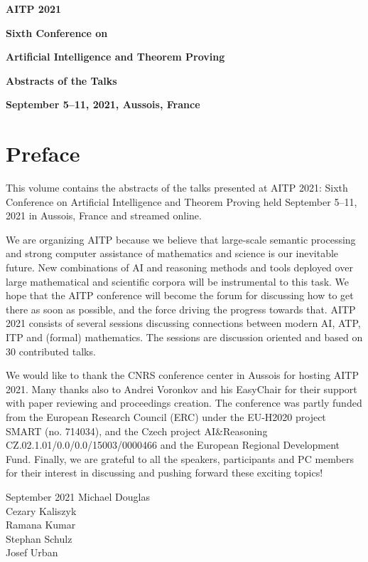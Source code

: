 \documentclass[a4paper]{llncs}
\begin{document}
\vspace*{2cm}
\centerline{\huge \bf AITP 2021}\vspace{3cm}
\centerline{\Large \bf Sixth Conference on}\vspace{3mm}
\centerline{\Large \bf Artificial Intelligence and Theorem Proving}\vspace{5cm}
\centerline{\Large \bf Abstracts of the Talks}\vspace{3cm}
\centerline{\large \bf September 5--11, 2021, Aussois, France}
\clearpage
\section*{Preface}

This volume contains the abstracts of the talks presented at AITP
2021: Sixth Conference on Artificial Intelligence and Theorem
Proving held September 5--11, 2021 in Aussois, France and streamed
online.

We are organizing AITP because we believe that large-scale semantic
processing and strong computer assistance of mathematics and science
is our inevitable future. New combinations of AI and reasoning methods
and tools deployed over large mathematical and scientific corpora will
be instrumental to this task. We hope that the AITP conference will
become the forum for discussing how to get there as soon as possible,
and the force driving the progress towards that.  AITP 2021 consists
of several sessions discussing connections between modern AI, ATP, ITP
and (formal) mathematics. The sessions are discussion oriented and
based on 30 contributed talks.

We would like to thank the CNRS conference center in Aussois for hosting AITP 2021.
Many thanks also to Andrei Voronkov and his EasyChair for their support with paper reviewing and
proceedings creation.  The conference was partly funded from the
European Research Council (ERC) under the EU-H2020 project SMART
(no. 714034), and the Czech project
AI\&Reasoning CZ.02.1.01/0.0/0.0/15003/0000466 and the European
Regional Development Fund.  Finally, we are grateful to all the
speakers, participants and PC members for their interest in discussing
and pushing forward these exciting topics!

\begin{flushright}
  \noindent September 2021\hfill
Michael Douglas\\
Cezary Kaliszyk\\
Ramana Kumar\\
Stephan Schulz\\
Josef Urban
\end{flushright}
\end{document}

